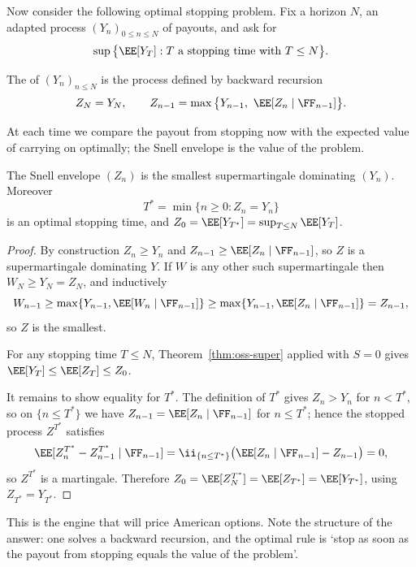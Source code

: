 Now consider the following optimal stopping problem. Fix a horizon $N$, an adapted process $(Y_n)_{0\leq n \leq N}$ of payouts, and ask for
$$
\sup\big\{\EE[Y_T] : T \text{ a stopping time with } T \leq N\big\}.
$$

\begin{definition}
	The  of $(Y_n)_{n \leq N}$ is the process defined by backward recursion
	$$
	Z_N = Y_N, \qquad Z_{n-1} = \max\big\{Y_{n-1},\ \EE[Z_n\mid\FF_{n-1}]\big\}.
	$$
\end{definition}

At each time we compare the payout from stopping now with the expected value of carrying on optimally; the Snell envelope is the value of the problem.

\begin{theorem}\label{thm:snell}
	The Snell envelope $(Z_n)$ is the smallest supermartingale dominating $(Y_n)$. Moreover
	$$
	T^* = \min\{n \geq 0 : Z_n = Y_n\}
	$$
	is an optimal stopping time, and $Z_0 = \EE[Y_{T^*}] = \sup_{T\leq N}\EE[Y_T]$.
\end{theorem}

\begin{proof}
	By construction $Z_n \geq Y_n$ and $Z_{n-1}\geq\EE[Z_n\mid\FF_{n-1}]$, so $Z$ is a supermartingale dominating $Y$. If $W$ is any other such supermartingale then $W_N \geq Y_N = Z_N$, and inductively
	$$
	W_{n-1}\geq\max\{Y_{n-1}, \EE[W_n\mid\FF_{n-1}]\} \geq \max\{Y_{n-1},\EE[Z_n\mid\FF_{n-1}]\} = Z_{n-1},
	$$
	so $Z$ is the smallest.

	For any stopping time $T \leq N$, Theorem~\ref{thm:oss-super} applied with $S = 0$ gives $\EE[Y_T]\leq\EE[Z_T]\leq Z_0$.

	It remains to show equality for $T^*$. The definition of $T^*$ gives $Z_n > Y_n$ for $n < T^*$, so on $\{n \leq T^*\}$ we have $Z_{n-1} = \EE[Z_n\mid\FF_{n-1}]$ for $n\leq T^*$; hence the stopped process $Z^{T^*}$ satisfies
	$$
	\EE[Z^{T^*}_n - Z^{T^*}_{n-1}\mid\FF_{n-1}] = \ii_{\{n\leq T^*\}}\big(\EE[Z_n\mid\FF_{n-1}] - Z_{n-1}\big) = 0,
	$$
	so $Z^{T^*}$ is a martingale. Therefore $Z_0 = \EE[Z^{T^*}_N] = \EE[Z_{T^*}] = \EE[Y_{T^*}]$, using $Z_{T^*} = Y_{T^*}$.
\end{proof}

This is the engine that will price American options. Note the structure of the answer: one solves a backward recursion, and the optimal rule is `stop as soon as the payout from stopping equals the value of the problem'.

